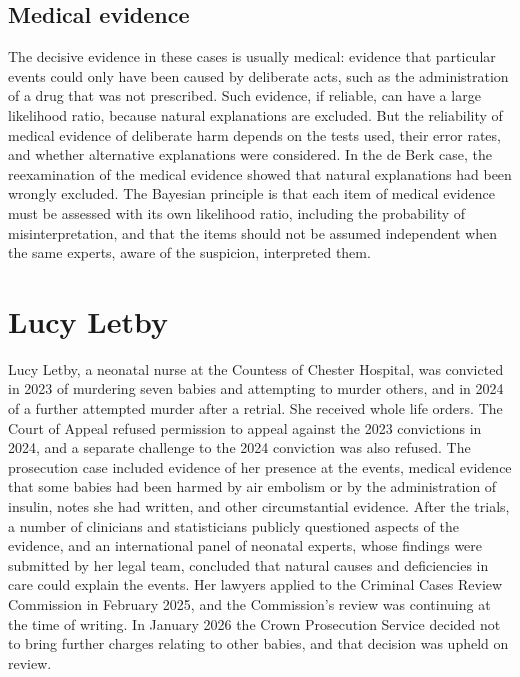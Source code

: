 \subsection{Medical evidence}

The decisive evidence in these cases is usually medical: evidence that particular events could only have been caused by deliberate acts, such as the administration of a drug that was not prescribed. Such evidence, if reliable, can have a large likelihood ratio, because natural explanations are excluded. But the reliability of medical evidence of deliberate harm depends on the tests used, their error rates, and whether alternative explanations were considered. In the de Berk case, the reexamination of the medical evidence showed that natural explanations had been wrongly excluded. The Bayesian principle is that each item of medical evidence must be assessed with its own likelihood ratio, including the probability of misinterpretation, and that the items should not be assumed independent when the same experts, aware of the suspicion, interpreted them.

\section{Lucy Letby}

Lucy Letby, a neonatal nurse at the Countess of Chester Hospital, was convicted in 2023 of murdering seven babies and attempting to murder others, and in 2024 of a further attempted murder after a retrial. She received whole life orders. The Court of Appeal refused permission to appeal against the 2023 convictions in 2024, and a separate challenge to the 2024 conviction was also refused. The prosecution case included evidence of her presence at the events, medical evidence that some babies had been harmed by air embolism or by the administration of insulin, notes she had written, and other circumstantial evidence. After the trials, a number of clinicians and statisticians publicly questioned aspects of the evidence, and an international panel of neonatal experts, whose findings were submitted by her legal team, concluded that natural causes and deficiencies in care could explain the events. Her lawyers applied to the Criminal Cases Review Commission in February 2025, and the Commission's review was continuing at the time of writing. In January 2026 the Crown Prosecution Service decided not to bring further charges relating to other babies, and that decision was upheld on review.

